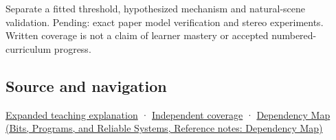 Separate a fitted threshold, hypothesized mechanism and natural-scene validation. Pending: exact paper model verification and stereo experiments. Written coverage is not a claim of learner mastery or accepted numbered-curriculum progress.

\subsection{Source and navigation}\label{appendix-8dc848f14052-source-and-navigation}

\hyperref[04-visual-computing-ii-ch042-binocular-depth-changes-the-optimization-question]{Expanded teaching explanation} · \hyperref[appendix-fd090d982a15-xr01---independent-seeing-and-representation-source]{Independent coverage} · \href{../01-Bits-Programs-and-Reliable-Systems/main.pdf\#nameddest=appendix-4ad47bdd269a}{Dependency Map (Bits, Programs, and Reliable Systems, Reference notes: Dependency Map)}
